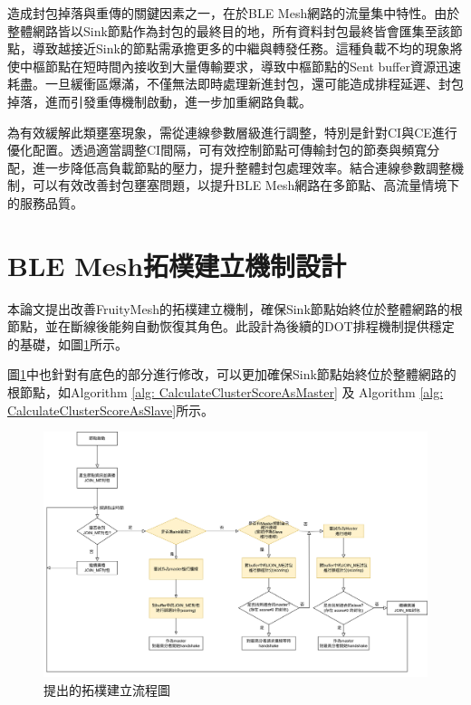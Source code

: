 \begin{ZhChapter}
造成封包掉落與重傳的關鍵因素之一，在於BLE Mesh網路的流量集中特性。由於整體網路皆以Sink節點作為封包的最終目的地，所有資料封包最終皆會匯集至該節點，導致越接近Sink的節點需承擔更多的中繼與轉發任務。這種負載不均的現象將使中樞節點在短時間內接收到大量傳輸要求，導致中樞節點的Sent buffer資源迅速耗盡。一旦緩衝區爆滿，不僅無法即時處理新進封包，還可能造成排程延遲、封包掉落，進而引發重傳機制啟動，進一步加重網路負載。

為有效緩解此類壅塞現象，需從連線參數層級進行調整，特別是針對CI與CE進行優化配置。透過適當調整CI間隔，可有效控制節點可傳輸封包的節奏與頻寬分配，進一步降低高負載節點的壓力，提升整體封包處理效率。結合連線參數調整機制，可以有效改善封包壅塞問題，以提升BLE Mesh網路在多節點、高流量情境下的服務品質。

\clearpage

\section{BLE Mesh拓樸建立機制設計}

本論文提出改善FruityMesh的拓樸建立機制，確保Sink節點始終位於整體網路的根節點，並在斷線後能夠自動恢復其角色。此設計為後續的DOT排程機制提供穩定的基礎，如圖\ref{fig: 提出的拓樸建立流程圖}所示。

圖\ref{fig: 提出的拓樸建立流程圖}中也針對有底色的部分進行修改，可以更加確保Sink節點始終位於整體網路的根節點，如Algorithm \ref{alg: CalculateClusterScoreAsMaster} 及 Algorithm \ref{alg: CalculateClusterScoreAsSlave}所示。

\begin{figure}[H]
    \centering
    \includegraphics[width = 1\textwidth]{image/build-up_pro2.png}
    \caption{提出的拓樸建立流程圖}
    \label{fig: 提出的拓樸建立流程圖}
\end{figure}


\end{ZhChapter}

